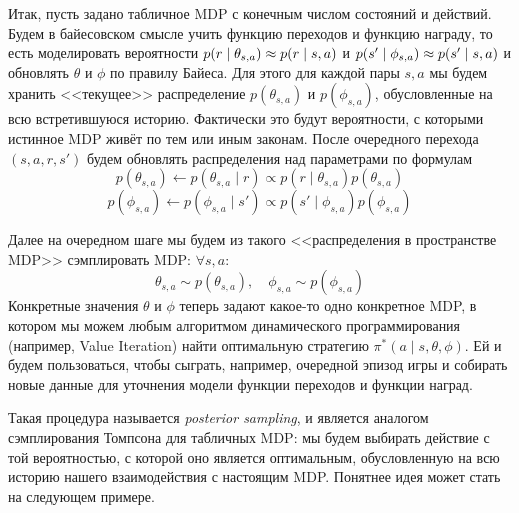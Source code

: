 Итак, пусть задано табличное MDP с конечным числом состояний и действий. Будем в байесовском смысле учить функцию переходов и функцию награду, то есть моделировать вероятности $p(r \HM \mid \theta_{s, a}) \HM \approx p(r \HM \mid s, a)$ и $p(s' \HM \mid \phi_{s, a}) \HM \approx p(s' \HM \mid s, a)$ и обновлять $\theta$ и $\phi$ по правилу Байеса. Для этого для каждой пары $s, a$ мы будем хранить <<текущее>> распределение $p(\theta_{s, a})$ и $p(\phi_{s, a})$, обусловленные на всю встретившуюся историю. Фактически это будут вероятности, с которыми истинное MDP живёт по тем или иным законам. После очередного перехода $(s, a, r, s')$ будем обновлять распределения над параметрами по формулам
\begin{equation*}
p(\theta_{s, a}) \leftarrow p(\theta_{s, a} \mid r) \propto p(r \mid \theta_{s, a})p(\theta_{s, a})
\end{equation*}
\begin{equation*}
p(\phi_{s, a}) \leftarrow p(\phi_{s, a} \mid s') \propto p(s' \mid \phi_{s, a})p(\phi_{s, a})
\end{equation*}

Далее на очередном шаге мы будем из такого <<распределения в пространстве MDP>> сэмплировать MDP: $\forall s, a \colon$
$$\theta_{s, a} \sim p(\theta_{s, a}), \quad \phi_{s, a} \sim p(\phi_{s, a})$$
Конкретные значения $\theta$ и $\phi$ теперь задают какое-то одно конкретное MDP, в котором мы можем любым алгоритмом динамического программирования (например, Value Iteration) найти оптимальную стратегию $\pi^*(a \mid s, \theta, \phi)$. Ей и будем пользоваться, чтобы сыграть, например, очередной эпизод игры и собирать новые данные для уточнения модели функции переходов и функции наград.

Такая процедура называется \emph{posterior sampling}, и является аналогом сэмплирования Томпсона для табличных MDP: мы будем выбирать действие с той вероятностью, с которой оно является оптимальным, обусловленную на всю историю нашего взаимодействия с настоящим MDP. Понятнее идея может стать на следующем примере.

